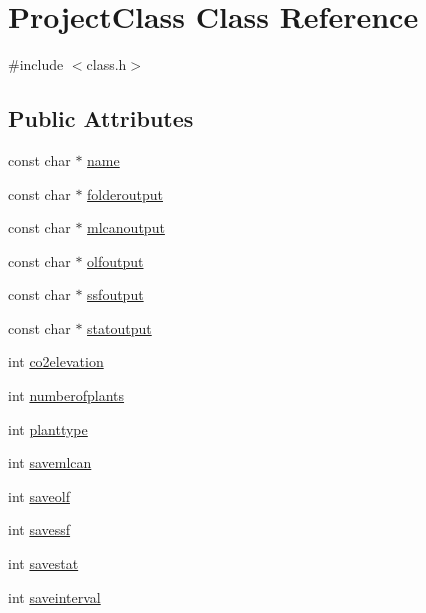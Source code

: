 \hypertarget{class_project_class}{}\section{Project\+Class Class Reference}
\label{class_project_class}


{\ttfamily \#include $<$class.\+h$>$}

\subsection*{Public Attributes}
\begin{DoxyCompactItemize}
\item 
const char $\ast$ \hyperlink{class_project_class_a7b6cc08b020a4a41c9a0c85afa46203f}{name}
\item 
const char $\ast$ \hyperlink{class_project_class_a4e17c55e3fe53b5286d9a9e1610a175a}{folderoutput}
\item 
const char $\ast$ \hyperlink{class_project_class_aee378d43ec891d6a5bc7cf6d2a4e427f}{mlcanoutput}
\item 
const char $\ast$ \hyperlink{class_project_class_a3eb97eb6ed07af5bc4835cfea019acdb}{olfoutput}
\item 
const char $\ast$ \hyperlink{class_project_class_ac9b05465d12ec7b1620f8b3cdd6bfba2}{ssfoutput}
\item 
const char $\ast$ \hyperlink{class_project_class_ac6a3a48659d947893b4f1111c328e5d7}{statoutput}
\item 
int \hyperlink{class_project_class_a5c406f6440301c7d7860bc1be0738190}{co2elevation}
\item 
int \hyperlink{class_project_class_a0fa7f1ea91a1316004315e9f24cd8fd8}{numberofplants}
\item 
int \hyperlink{class_project_class_a0fbf0dabcdb80461f7e2adbdcd994891}{planttype}
\item 
int \hyperlink{class_project_class_a6ac25315edc517b194cfbd8c5d0d826f}{savemlcan}
\item 
int \hyperlink{class_project_class_a846b1a14d2b54962e7a5125b0187f815}{saveolf}
\item 
int \hyperlink{class_project_class_ae37719a69109faa2eb796fa81b56762b}{savessf}
\item 
int \hyperlink{class_project_class_a96e83ee82b57065583f29feeeb60baac}{savestat}
\item 
int \hyperlink{class_project_class_ae5bb084336bd24afe95874e86848b932}{saveinterval}
\item 

\end{DoxyCompactItemize}
